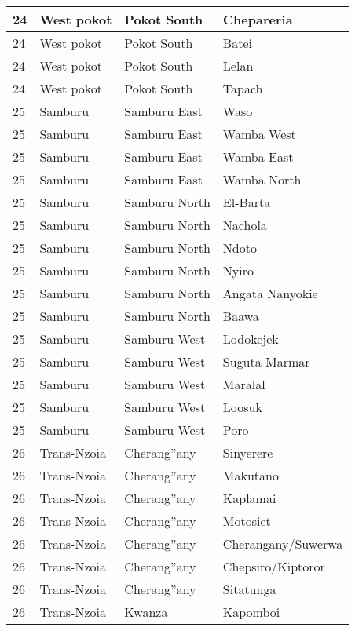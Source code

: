 \begin{table}[!ht]
\begin{tabular}{|l|l|l|l|}
        24 & West pokot & Pokot South & Chepareria \\ \hline
        24 & West pokot & Pokot South & Batei \\ \hline
        24 & West pokot & Pokot South & Lelan \\ \hline
        24 & West pokot & Pokot South & Tapach \\ \hline
        25 & Samburu & Samburu East & Waso \\ \hline
        25 & Samburu & Samburu East & Wamba West \\ \hline
        25 & Samburu & Samburu East & Wamba East \\ \hline
        25 & Samburu & Samburu East & Wamba North \\ \hline
        25 & Samburu & Samburu North & El-Barta \\ \hline
        25 & Samburu & Samburu North & Nachola \\ \hline
        25 & Samburu & Samburu North & Ndoto \\ \hline
        25 & Samburu & Samburu North & Nyiro \\ \hline
        25 & Samburu & Samburu North & Angata Nanyokie \\ \hline
        25 & Samburu & Samburu North & Baawa \\ \hline
        25 & Samburu & Samburu West & Lodokejek \\ \hline
        25 & Samburu & Samburu West & Suguta Marmar \\ \hline
        25 & Samburu & Samburu West & Maralal \\ \hline
        25 & Samburu & Samburu West & Loosuk \\ \hline
        25 & Samburu & Samburu West & Poro \\ \hline
        26 & Trans-Nzoia & Cherang''any & Sinyerere \\ \hline
        26 & Trans-Nzoia & Cherang''any & Makutano \\ \hline
        26 & Trans-Nzoia & Cherang''any & Kaplamai \\ \hline
        26 & Trans-Nzoia & Cherang''any & Motosiet \\ \hline
        26 & Trans-Nzoia & Cherang''any & Cherangany/Suwerwa \\ \hline
        26 & Trans-Nzoia & Cherang''any & Chepsiro/Kiptoror \\ \hline
        26 & Trans-Nzoia & Cherang''any & Sitatunga \\ \hline
        26 & Trans-Nzoia & Kwanza & Kapomboi \\ \hline

\end{tabular}
\end{table}
